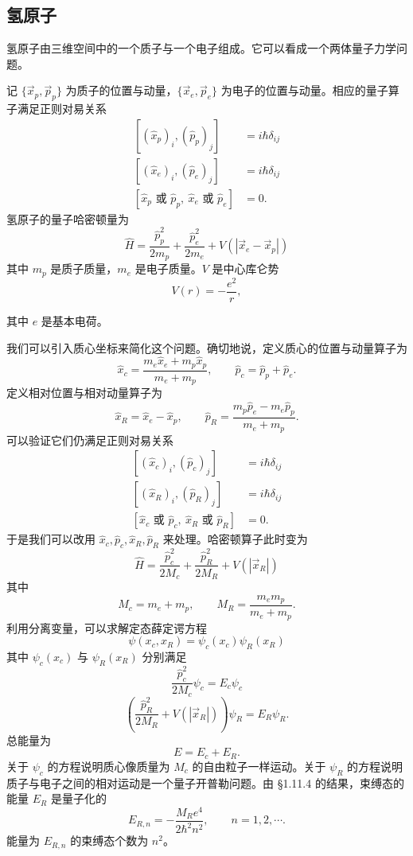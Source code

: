 \subsection{氢原子}

氢原子由三维空间中的一个质子与一个电子组成。它可以看成一个两体量子力学问题。

记 \(\{\vec x_p,\vec p_p\}\) 为质子的位置与动量，\(\{\vec x_e,\vec p_e\}\) 为电子的位置与动量。相应的量子算子满足正则对易关系
\[
  \begin{aligned}
    \left[(\hat x_p)_i,(\hat p_p)_j\right]&=i\hbar\delta_{ij}\\
    \left[(\hat x_e)_i,(\hat p_e)_j\right]&=i\hbar\delta_{ij}\\
    \left[\hat x_p \text{ 或 } \hat p_p,\ \hat x_e \text{ 或 } \hat p_e\right]&=0.
  \end{aligned}
\]
氢原子的量子哈密顿量为
\[
  \hat H=\frac{\hat p_p^2}{2m_p}+\frac{\hat p_e^2}{2m_e}+V(|\vec x_e-\vec x_p|)
\]
其中 \(m_p\) 是质子质量，\(m_e\) 是电子质量。\(V\) 是中心库仑势
\[
  V(r)=-\frac{e^2}{r},
\]

其中 \(e\) 是基本电荷。

我们可以引入质心坐标来简化这个问题。确切地说，定义质心的位置与动量算子为
\[
  \hat x_c=\frac{m_e\hat x_e+m_p\hat x_p}{m_e+m_p},\qquad
  \hat p_c=\hat p_p+\hat p_e.
\]
定义相对位置与相对动量算子为
\[
  \hat x_R=\hat x_e-\hat x_p,\qquad
  \hat p_R=\frac{m_p\hat p_e-m_e\hat p_p}{m_e+m_p}.
\]
可以验证它们仍满足正则对易关系
\[
  \begin{aligned}
    \left[(\hat x_c)_i,(\hat p_c)_j\right]&=i\hbar\delta_{ij}\\
    \left[(\hat x_R)_i,(\hat p_R)_j\right]&=i\hbar\delta_{ij}\\
    \left[\hat x_c \text{ 或 } \hat p_c,\ \hat x_R \text{ 或 } \hat p_R\right]&=0.
  \end{aligned}
\]
于是我们可以改用 \(\hat x_c,\hat p_c,\hat x_R,\hat p_R\) 来处理。哈密顿算子此时变为
\[
  \hat H=\frac{\hat p_c^2}{2M_c}+\frac{\hat p_R^2}{2M_R}+V(|\vec x_R|)
\]
其中
\[
  M_c=m_e+m_p,\qquad M_R=\frac{m_em_p}{m_e+m_p}.
\]
利用分离变量，可以求解定态薛定谔方程
\[
  \psi(x_c,x_R)=\psi_c(x_c)\psi_R(x_R)
\]
其中 \(\psi_c(x_c)\) 与 \(\psi_R(x_R)\) 分别满足
\[
  \frac{\hat p_c^2}{2M_c}\psi_c=E_c\psi_c
\]
\[
  \left(\frac{\hat p_R^2}{2M_R}+V(|\vec x_R|)\right)\psi_R=E_R\psi_R.
\]
总能量为
\[
  E=E_c+E_R.
\]
关于 \(\psi_c\) 的方程说明质心像质量为 \(M_c\) 的自由粒子一样运动。关于 \(\psi_R\) 的方程说明质子与电子之间的相对运动是一个量子开普勒问题。由 §1.11.4 的结果，束缚态的能量 \(E_R\) 是量子化的
\[
  E_{R,n}=-\frac{M_Re^4}{2\hbar^2n^2},\qquad n=1,2,\cdots.
\]
能量为 \(E_{R,n}\) 的束缚态个数为 \(n^2\)。

